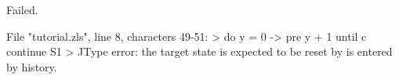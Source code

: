 \runverbatimfalse
{}
\begin{RunVerbatimMsg}
Failed.
\end{RunVerbatimMsg}
\begin{RunVerbatimErr}
File "tutorial.zls", line 8, characters 49-51:
>          do y = 0 -> pre y + 1 until c continue S1
>                                                 ^^
Type error: the target state is expected to be reset by is entered by history.
\end{RunVerbatimErr}
